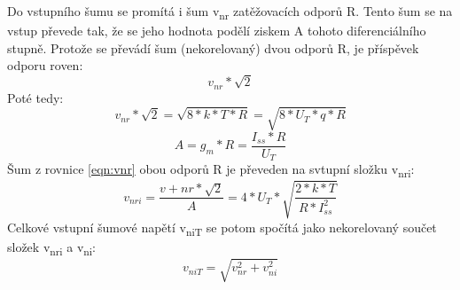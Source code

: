 Do vstupního šumu se promítá i šum v\textsubscript{nr} zatěžovacích odporů R. Tento šum se na vstup převede tak, že se jeho hodnota podělí ziskem A tohoto diferenciálního stupně. Protože se převádí šum (nekorelovaný) dvou odporů R, je příspěvek odporu roven:
\begin{equation}
v_{nr}*\sqrt{2}
\label{eqn:vnr}
\end{equation}
Poté tedy:
\begin{equation}
v_{nr}*\sqrt{2}=\sqrt{8*k*T*R}=\sqrt{8*U_{T}*q*R}
\end{equation}
\begin{equation}
A=g_{m}*R=\frac{I_{ss}*R}{U_{T}}
\end{equation}
Šum z rovnice \ref{eqn:vnr} obou odporů R je převeden na svtupní složku v\textsubscript{nri}:
\begin{equation}
v_{nri}=\frac{v+{nr}*\sqrt{2}}{A}=4*U_{T}*\sqrt{\frac{2*k*T}{R*I_{ss}^2}}
\end{equation}
Celkové vstupní šumové napětí v\textsubscript{niT} se potom spočítá jako nekorelovaný součet složek v\textsubscript{nri} a v\textsubscript{ni}:
\begin{equation}
v_{niT}=\sqrt{v_{nr}^2+v_{ni}^2}
\end{equation}




























